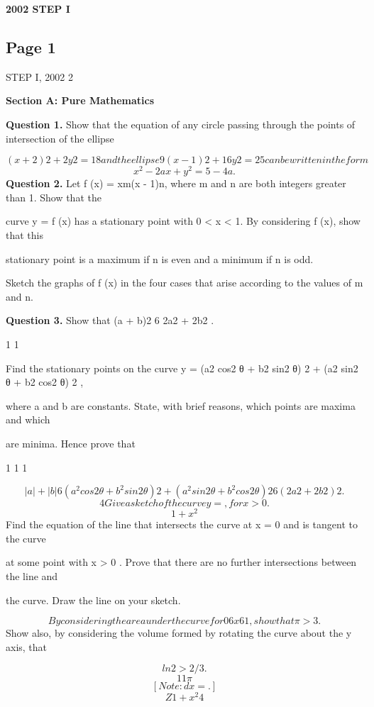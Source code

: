 \documentclass[12pt]{article}
\begin{document}
\begin{center}
{\Large \textbf{2002 STEP I}}
\end{center}

\subsection*{Page 1}
\begin{flushleft}
STEP I, 2002 2\par
\bigskip\textbf{Section A: Pure Mathematics}\par
\bigskip\textbf{Question 1.} Show that the equation of any circle passing through the points of intersection of the ellipse\par
\[(x + 2)2 + 2y2 = 18 and the ellipse 9(x - 1)2 + 16y2 = 25 can be written in the form\]
\[x^2 - 2ax + y^2 = 5 - 4a .\]
\bigskip\textbf{Question 2.} Let f (x) = xm(x - 1)n, where m and n are both integers greater than 1. Show that the\par
curve y = f (x) has a stationary point with 0 < x < 1. By considering f (x), show that this\par
stationary point is a maximum if n is even and a minimum if n is odd.\par
Sketch the graphs of f (x) in the four cases that arise according to the values of m and n.\par
\bigskip\textbf{Question 3.} Show that (a + b)2 6 2a2 + 2b2 .\par
1 1\par
Find the stationary points on the curve y = (a2 cos2 θ + b2 sin2 θ) 2 + (a2 sin2 θ + b2 cos2 θ) 2 ,\par
where a and b are constants. State, with brief reasons, which points are maxima and which\par
are minima. Hence prove that\par
1 1 1\par
\[|a| + |b| 6 (a^2 cos2 θ + b^2 sin2 θ) 2 + (a^2 sin2 θ + b^2 cos2 θ) 2 6 (2a2 + 2b2) 2 .\]
\[4 Give a sketch of the curve y = , for x > 0.\]
\[1 + x^2\]
Find the equation of the line that intersects the curve at x = 0 and is tangent to the curve\par
at some point with x > 0 . Prove that there are no further intersections between the line and\par
the curve. Draw the line on your sketch.\par
\[By considering the area under the curve for 0 6 x 6 1, show that \pi > 3 .\]
Show also, by considering the volume formed by rotating the curve about the y axis, that\par
\[ln 2 > 2/3 .\]
\[1 1 \pi\]
\[[ Note: dx = . ]\]
\[Z 1 + x^2 4\]
\end{flushleft}
\end{document}
